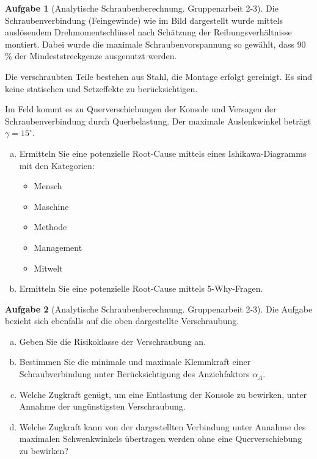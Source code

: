 \documentclass[10pt,a4paper,headsepline,smallheadings]{scrartcl}
\theoremstyle{definition}
\newtheorem{aufgabe}{Aufgabe}
\begin{document}
\begin{aufgabe}[Analytische Schraubenberechnung. Gruppenarbeit 2-3] 

         	
   
Die Schraubenverbindung (Feingewinde) wie im Bild dargestellt wurde mittels ausl\"osendem Drehmomentschl\"ussel nach Sch\"atzung der Reibungsverh\"altnisse montiert. Dabei wurde die maximale Schraubenvorspannung so gew\"ahlt, dass 90 \% der Mindeststreckgenze ausgenutzt werden.

Die verschraubten Teile bestehen aus Stahl, die Montage erfolgt gereinigt. Es sind keine statischen und Setzeffekte zu ber\"ucksichtigen.

Im Feld kommt es zu Querverschiebungen der Konsole und Versagen der Schraubenverbindung durch Querbelastung. Der maximale Auslenkwinkel betr\"agt $\gamma = 15^{\circ}$. 

\begin{enumerate}[a)]
\item Ermitteln Sie eine potenzielle Root-Cause mittels eines Ishikawa-Diagramms mit den Kategorien:
	\begin{itemize}
		\item Mensch
		\item Maschine
		\item Methode
		\item Management
		\item Mitwelt
	\end{itemize}
\item Ermitteln Sie eine potenzielle Root-Cause mittels 5-Why-Fragen.
\end{enumerate}
\end{aufgabe}
\newpage
\begin{aufgabe}[Analytische Schraubenberechnung. Gruppenarbeit 2-3] 
Die Aufgabe bezieht sich ebenfalls auf die oben dargestellte Verschraubung.
\begin{enumerate}[a)]
\item Geben Sie die Risikoklasse der Verschraubung an.
\item Bestimmen Sie die minimale und maximale Klemmkraft einer Schraubverbindung unter Ber\"ucksichtigung des Anziehfaktors $\alpha_{A}$.
\item Welche Zugkraft gen\"ugt, um eine Entlastung der Konsole zu bewirken, unter Annahme der ung\"unstigsten Verschraubung. 
\item Welche Zugkraft kann von der dargestellten Verbindung unter Annahme des maximalen Schwenkwinkels \"ubertragen werden ohne eine Querverschiebung zu bewirken?
\end{enumerate}

\end{aufgabe}
\end{document}
